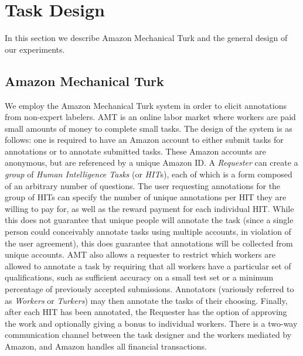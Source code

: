 \documentclass[11pt]{article}
\begin{document}
\section{ Task Design }

In this section we describe Amazon Mechanical Turk and the general design of our experiments.

\subsection{ Amazon Mechanical Turk }

We employ the Amazon Mechanical Turk system in order to elicit annotations from non-expert labelers.  %
AMT is an online labor market where workers are paid small amounts of money to complete small tasks.  The design of the system is as follows: one is required to have an Amazon account to either submit tasks for annotations or to annotate submitted tasks.  These Amazon accounts are anonymous, but are referenced by a unique Amazon ID.  A \textit{Requester} can create a \textit{group} of \textit{Human Intelligence Tasks} (or \textit{HIT}s), each of which is a form composed of an arbitrary number of questions.  The user requesting annotations for the group of HITs can specify the number of unique annotations per HIT they are willing to pay for, as well as the reward payment for each individual HIT.  While this does not guarantee that unique people will annotate the task (since a single person could conceivably annotate tasks using multiple accounts, in violation of the user agreement), this does guarantee that annotations will be collected from unique accounts.  AMT also allows a requester to restrict which workers are allowed to annotate a task by requiring that all workers have a particular set of qualifications, such as sufficient accuracy on a small test set or a minimum percentage of previously accepted submissions.  Annotators (variously referred to as \textit{Workers} or \textit{Turkers}) may then annotate the tasks of their choosing. Finally, after each HIT has been annotated, the Requester has the option of approving the work and optionally giving a bonus to individual workers. There is a two-way communication channel between the task designer and the workers mediated by Amazon, and Amazon handles all financial transactions.
 
\vspace*{-0.05in}
\end{document}
